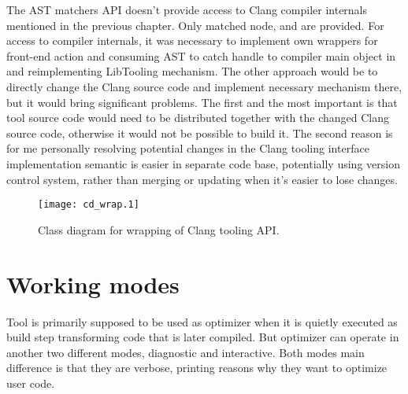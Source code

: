 The AST matchers API doesn't provide access to Clang compiler internals mentioned in the previous chapter. Only matched node,  and  are provided. For access to compiler internals, it was necessary to implement own wrappers for front-end action and consuming AST to catch handle to compiler main object in  and reimplementing LibTooling mechanism. The other approach would be to directly change the Clang source code and implement necessary mechanism there, but it would bring significant problems. The first and the most important is that tool source code would need to be distributed together with the changed Clang source code, otherwise it would not be possible to build it. The second reason is for me personally resolving potential changes in the Clang tooling interface implementation semantic is easier in separate code base, potentially using version control system, rather than merging or updating when it's easier to lose changes.

\begin{figure}[h!]
	\caption{Class diagram for wrapping of Clang tooling API.}
	\centering
		\texttt{[image: cd\_wrap.1]}
\end{figure}

\section{Working modes}
Tool is primarily supposed to be used as optimizer when it is quietly executed as build step transforming code that is later compiled. But optimizer can operate in another two different modes, diagnostic and interactive. Both modes main difference is that they are verbose, printing reasons why they want to optimize user code.

